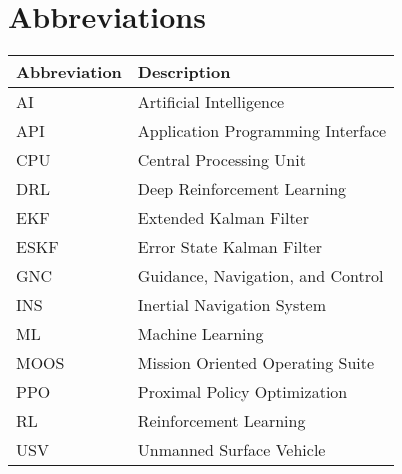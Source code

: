 \section*{Abbreviations}

\begin{longtable}[l]{p{} p{}}
    \textbf{Abbreviation} & \textbf{Description} \\
    \hline
    AI     & Artificial Intelligence \\
    API    & Application Programming Interface \\
    CPU    & Central Processing Unit \\
    DRL    & Deep Reinforcement Learning \\
    EKF    & Extended Kalman Filter \\
    ESKF   & Error State Kalman Filter \\
    GNC    & Guidance, Navigation, and Control \\
    INS    & Inertial Navigation System \\
    ML     & Machine Learning \\
    MOOS   & Mission Oriented Operating Suite \\
    PPO    & Proximal Policy Optimization \\
    RL     & Reinforcement Learning \\
    USV    & Unmanned Surface Vehicle \\
    \hline
\end{longtable}